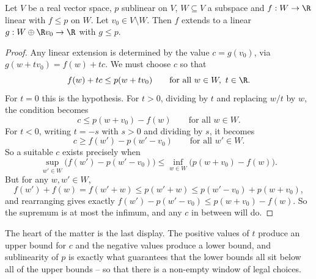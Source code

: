 \begin{lemma}
	Let $V$ be a real vector space, $p$ sublinear on $V$, $W \subseteq V$ a subspace and $f : W \to \R$ linear with $f \leq p$ on $W$. Let $v_0 \in V \setminus W$. Then $f$ extends to a linear $g : W \oplus \R v_0 \to \R$ with $g \leq p$.
\end{lemma}

\begin{proof}
	Any linear extension is determined by the value $c = g(v_0)$, via $g(w + t v_0) = f(w) + tc$. We must choose $c$ so that
	$$f(w) + tc \leq p(w + t v_0) \qquad \text{for all } w \in W, \ t \in \R.$$
	For $t = 0$ this is the hypothesis. For $t > 0$, dividing by $t$ and replacing $w/t$ by $w$, the condition becomes
	$$c \leq p(w + v_0) - f(w) \qquad \text{for all } w \in W.$$
	For $t < 0$, writing $t = -s$ with $s>0$ and dividing by $s$, it becomes
	$$c \geq f(w') - p(w' - v_0) \qquad \text{for all } w' \in W.$$
	So a suitable $c$ exists precisely when
	$$\sup_{w' \in W} \big( f(w') - p(w' - v_0) \big) \leq \inf_{w \in W} \big( p(w + v_0) - f(w) \big).$$
	But for any $w, w' \in W$,
	$$f(w') + f(w) = f(w' + w) \leq p(w' + w) \leq p(w' - v_0) + p(w + v_0),$$
	and rearranging gives exactly $f(w') - p(w' - v_0) \leq p(w + v_0) - f(w)$. So the supremum is at most the infimum, and any $c$ in between will do.
\end{proof}

The heart of the matter is the last display. The positive values of $t$ produce an upper bound for $c$ and the negative values produce a lower bound, and sublinearity of $p$ is exactly what guarantees that the lower bounds all sit below all of the upper bounds -- so that there is a non-empty window of legal choices.

\begin{center}
\end{center}

